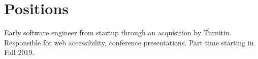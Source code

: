 \section{Positions}

\vspace{6pt}


\vspace{6pt}

{\vspace{5pt}Early software engineer from startup through an acquisition by Turnitin. Responsible for web accessibility, conference presentations. Part time starting in Fall 2019.}
    
\vspace{5pt}
    

    
    
   
   

